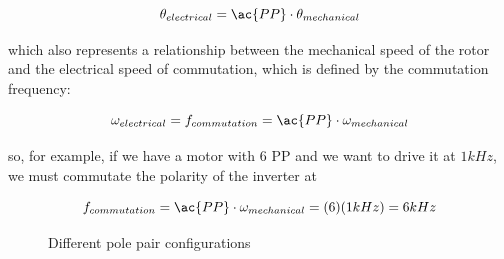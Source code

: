 \begin{equation}
	\label{eq:pole_pairs}
	\theta_{electrical} = \ac{PP} \cdot \theta_{mechanical}
\end{equation}

which also represents a relationship between the mechanical speed of the rotor and the electrical speed of commutation, which is defined by the commutation frequency:

\begin{equation}
	\label{eq:pole_pairs_2}
	\omega_{electrical} = f_{commutation} = \ac{PP} \cdot \omega_{mechanical}
\end{equation}

so, for example, if we have a motor with 6 \ac{PP} and we want to drive it at $1 kHz$, we must commutate the polarity of the inverter at 

\begin{equation}
	f_{commutation} = \ac{PP} \cdot \omega_{mechanical} = (6) (1 kHz) = 6 kHz
\end{equation}

\begin{figure}[htbp]
	\centering
    \hfill
    \hfill
    \caption{Different pole pair configurations}
    \label{fig:pole_pairs}
\end{figure}

